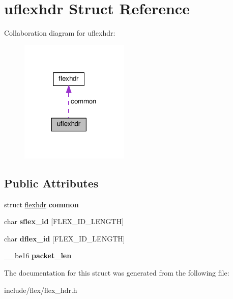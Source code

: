 \hypertarget{structuflexhdr}{}\section{uflexhdr Struct Reference}
\label{structuflexhdr}


Collaboration diagram for uflexhdr\+:\nopagebreak
\begin{figure}[H]
\begin{center}
\leavevmode
\includegraphics[width=147pt]{structuflexhdr__coll__graph}
\end{center}
\end{figure}
\subsection*{Public Attributes}
\begin{DoxyCompactItemize}
\item 
struct \hyperlink{structflexhdr}{flexhdr} {\bfseries common}\hypertarget{structuflexhdr_a298ecaecd1223467c1820a652458cff9}{}\label{structuflexhdr_a298ecaecd1223467c1820a652458cff9}

\item 
char {\bfseries sflex\+\_\+id} \mbox{[}F\+L\+E\+X\+\_\+\+I\+D\+\_\+\+L\+E\+N\+G\+TH\mbox{]}\hypertarget{structuflexhdr_a359db5a95d160b5bacdde8883a9d1ee7}{}\label{structuflexhdr_a359db5a95d160b5bacdde8883a9d1ee7}

\item 
char {\bfseries dflex\+\_\+id} \mbox{[}F\+L\+E\+X\+\_\+\+I\+D\+\_\+\+L\+E\+N\+G\+TH\mbox{]}\hypertarget{structuflexhdr_a8733c5298ef2cdefd132ecec4878605f}{}\label{structuflexhdr_a8733c5298ef2cdefd132ecec4878605f}

\item 
\+\_\+\+\_\+be16 {\bfseries packet\+\_\+len}\hypertarget{structuflexhdr_a633f53e21cbca9248040e940553af36e}{}\label{structuflexhdr_a633f53e21cbca9248040e940553af36e}

\end{DoxyCompactItemize}


The documentation for this struct was generated from the following file\+:\begin{DoxyCompactItemize}
\item 
include/flex/flex\+\_\+hdr.\+h\end{DoxyCompactItemize}
